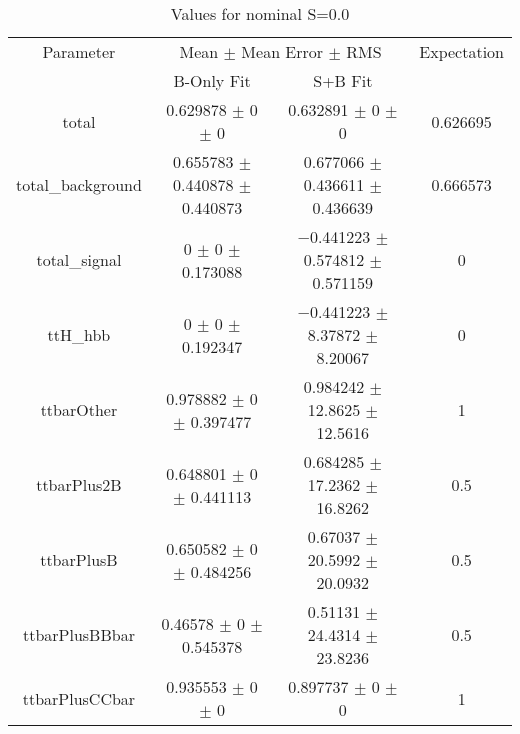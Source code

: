 \begin{table}
\centering
\caption{Values for nominal S=0.0}
\begin{tabular}{cccc}
\toprule
Parameter & \multicolumn{2}{c}{Mean $\pm$ Mean Error $\pm$ RMS} & Expectation\\
 & B-Only Fit & S+B Fit & \\
\midrule
total & \num{0.629878} $\pm$ \num{0} $\pm$ \num{0} & \num{0.632891} $\pm$ \num{0} $\pm$ \num{0} & \num{0.626695}\\
total\_background & \num{0.655783} $\pm$ \num{0.440878} $\pm$ \num{0.440873} & \num{0.677066} $\pm$ \num{0.436611} $\pm$ \num{0.436639} & \num{0.666573}\\
total\_signal & \num{0} $\pm$ \num{0} $\pm$ \num{0.173088} & \num{-0.441223} $\pm$ \num{0.574812} $\pm$ \num{0.571159} & \num{0}\\
ttH\_hbb & \num{0} $\pm$ \num{0} $\pm$ \num{0.192347} & \num{-0.441223} $\pm$ \num{8.37872} $\pm$ \num{8.20067} & \num{0}\\
ttbarOther & \num{0.978882} $\pm$ \num{0} $\pm$ \num{0.397477} & \num{0.984242} $\pm$ \num{12.8625} $\pm$ \num{12.5616} & \num{1}\\
ttbarPlus2B & \num{0.648801} $\pm$ \num{0} $\pm$ \num{0.441113} & \num{0.684285} $\pm$ \num{17.2362} $\pm$ \num{16.8262} & \num{0.5}\\
ttbarPlusB & \num{0.650582} $\pm$ \num{0} $\pm$ \num{0.484256} & \num{0.67037} $\pm$ \num{20.5992} $\pm$ \num{20.0932} & \num{0.5}\\
ttbarPlusBBbar & \num{0.46578} $\pm$ \num{0} $\pm$ \num{0.545378} & \num{0.51131} $\pm$ \num{24.4314} $\pm$ \num{23.8236} & \num{0.5}\\
ttbarPlusCCbar & \num{0.935553} $\pm$ \num{0} $\pm$ \num{0} & \num{0.897737} $\pm$ \num{0} $\pm$ \num{0} & \num{1}\\
\bottomrule
\end{tabular}
\end{table}